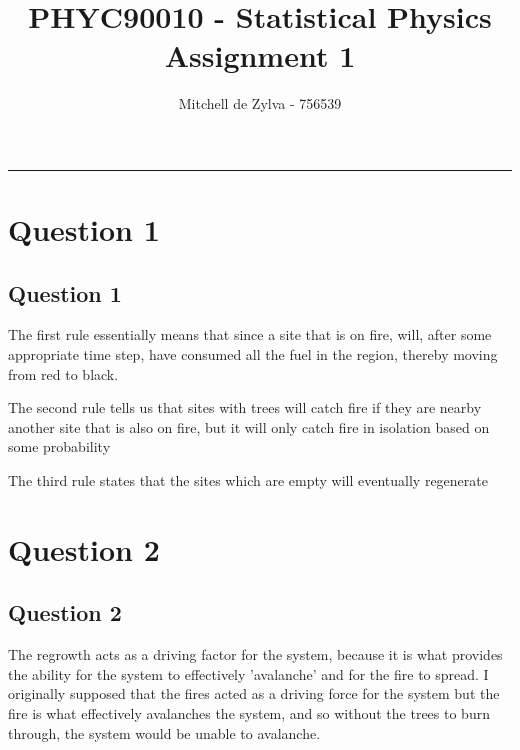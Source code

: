 \documentclass[11pt,a4paper]{article}
\begin{document}
\title{\bf PHYC90010 - Statistical Physics Assignment 1}
\author{Mitchell de Zylva - 756539}
\maketitle



\begin{center}
\vspace{1cm}
\rule{145mm}{0.5mm}
\vspace{1cm}
\end{center}
\tableofcontents
\newpage
%
\newpage



\section{Question 1}
\label{sec:question1}
\subsection{Question 1}
\label{sec:question1:subsec:parta}
\par The first rule essentially means that since a site that is on fire, will, after some appropriate time step, have consumed all the fuel in the region, thereby moving from red to black.
\par The second rule tells us that sites with trees will catch fire if they are nearby another site that is also on fire, but it will only catch fire in isolation based on some probability
\par The third rule states that the sites which are empty will eventually regenerate
\section{Question 2}
\label{sec:question2}


\subsection{Question 2}
\label{sec:question2:subsec:parta}
The regrowth acts as a driving factor for the system, because it is what provides the ability for the system to effectively 'avalanche' and for the fire to spread. I originally supposed that the fires acted as a driving force for the system but the fire is what effectively avalanches the system, and so without the trees to burn through, the system would be unable to avalanche.
\end{document}
